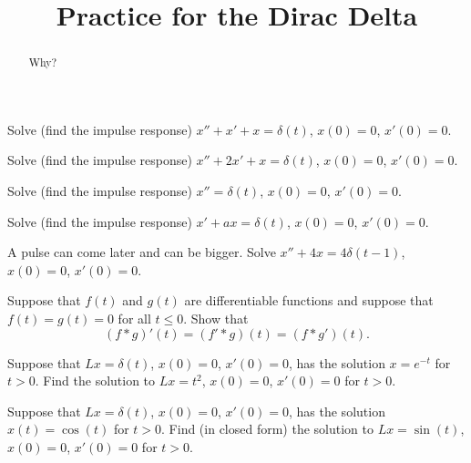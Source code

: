 \documentclass{ximera}
\title{Practice for the Dirac Delta}
\begin{document}
\begin{abstract}
Why?
\end{abstract}
\maketitle



\begin{exercise}
    Solve (find the impulse response) $x'' + x' + x = \delta(t)$, $x(0) = 0$, $x'(0)=0$.
\end{exercise}

\begin{exercise}
    Solve (find the impulse response) $x'' + 2 x' + x = \delta(t)$, $x(0) = 0$, $x'(0)=0$.
\end{exercise}

\begin{exercise}%
    Solve (find the impulse response) $x'' = \delta(t)$, $x(0) = 0$, $x'(0)=0$.
\end{exercise}

\begin{exercise}%
    Solve (find the impulse response) $x' + a x = \delta(t)$, $x(0) = 0$, $x'(0)=0$.
\end{exercise}

\begin{exercise}
    A pulse can come later and can be bigger. Solve $x'' + 4 x = 4\delta(t-1)$, $x(0) = 0$, $x'(0)=0$.
\end{exercise}

\begin{exercise}
    Suppose that $f(t)$ and $g(t)$ are differentiable functions and suppose that $f(t) = g(t) = 0$ for all $t \leq 0$.  Show that
    \begin{equation*}
        (f * g)'(t) = (f' * g)(t) = (f * g')(t) .
    \end{equation*}
\end{exercise}

\begin{exercise}
    Suppose that $L x = \delta(t)$, $x(0) = 0$, $x'(0) = 0$, has the solution $x = e^{-t}$ for $t > 0$.  Find the solution to $Lx = t^2$, $x(0) = 0$, $x'(0) = 0$ for $t > 0$.
\end{exercise}

\begin{exercise}%
Suppose that $L x = \delta(t)$, $x(0) = 0$, $x'(0) = 0$, has the solution $x(t) = \cos(t)$ for $t > 0$.  Find (in closed form) the solution to $Lx = \sin(t)$, $x(0) = 0$, $x'(0) = 0$ for $t > 0$.
\end{exercise}
\end{document}
